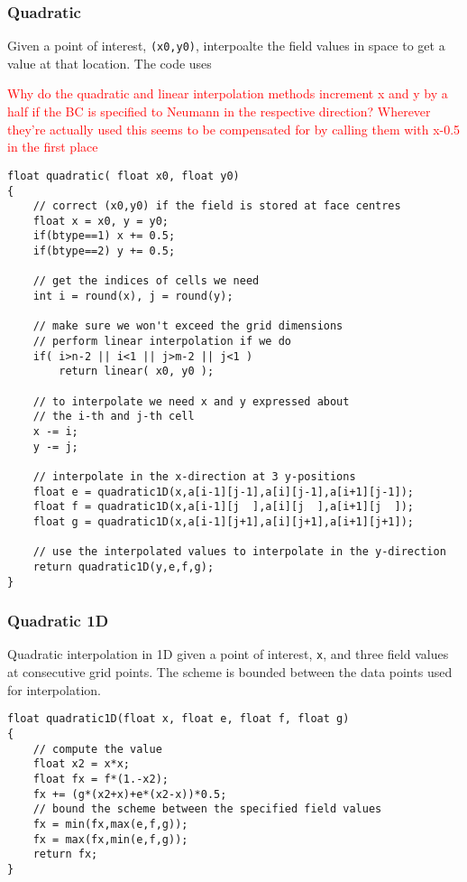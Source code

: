 \documentclass[notitlepage]{article}
\begin{document}
\subsubsection{Quadratic}

Given a point of interest, \texttt{(x0,y0)}, interpoalte the field values in space to
get a value at that location. The code uses

\textcolor{red}{Why do the quadratic and linear interpolation methods increment x and y
by a half if the BC is specified to Neumann in the respective direction? Wherever they're
actually used this seems to be compensated for by calling them with x-0.5 in the first place}

\begin{lstlisting}[style=myCpp]
float quadratic( float x0, float y0)
{
	// correct (x0,y0) if the field is stored at face centres
	float x = x0, y = y0;
	if(btype==1) x += 0.5;
	if(btype==2) y += 0.5;
	
	// get the indices of cells we need
	int i = round(x), j = round(y);
	
	// make sure we won't exceed the grid dimensions
	// perform linear interpolation if we do
	if( i>n-2 || i<1 || j>m-2 || j<1 )
		return linear( x0, y0 );
	
	// to interpolate we need x and y expressed about
	// the i-th and j-th cell
	x -= i;
	y -= j;
	
	// interpolate in the x-direction at 3 y-positions
	float e = quadratic1D(x,a[i-1][j-1],a[i][j-1],a[i+1][j-1]);
	float f = quadratic1D(x,a[i-1][j  ],a[i][j  ],a[i+1][j  ]);
	float g = quadratic1D(x,a[i-1][j+1],a[i][j+1],a[i+1][j+1]);
	
	// use the interpolated values to interpolate in the y-direction
	return quadratic1D(y,e,f,g);
}
\end{lstlisting}

\subsubsection{Quadratic 1D}

Quadratic interpolation in 1D given a point of interest, \texttt{x}, and three field
values at consecutive grid points. The scheme is bounded between the data points
used for interpolation.

\begin{lstlisting}[style=myCpp]
float quadratic1D(float x, float e, float f, float g)
{
	// compute the value
	float x2 = x*x;
	float fx = f*(1.-x2);
	fx += (g*(x2+x)+e*(x2-x))*0.5;
	// bound the scheme between the specified field values
	fx = min(fx,max(e,f,g));
	fx = max(fx,min(e,f,g));
	return fx;
} 
\end{lstlisting}
\end{document}
